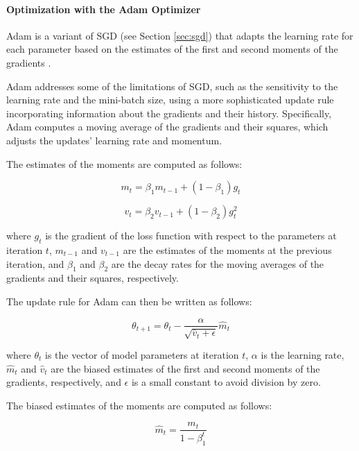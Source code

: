 \paragraph{Optimization with the Adam Optimizer} \label{sec:adam}

Adam is a variant of \ac{SGD} (see Section \ref{sec:sgd}) that adapts the learning rate for each parameter based on the estimates of the first and second moments of the gradients \cite{kingma_adam_2017}.

Adam addresses some of the limitations of \ac{SGD}, such as the sensitivity to the learning rate and the mini-batch size, using a more sophisticated update rule incorporating information about the gradients and their history. Specifically, Adam computes a moving average of the gradients and their squares, which adjusts the updates' learning rate and momentum.

The estimates of the moments are computed as follows:

\begin{equation}
    m_t = \beta_1 m_{t-1} + (1-\beta_1)g_t
\end{equation}

\begin{equation}
    v_t = \beta_2 v_{t-1} + (1-\beta_2)g_t^2
\end{equation}

where $g_t$ is the gradient of the loss function with respect to the parameters at iteration $t$, $m_{t-1}$ and $v_{t-1}$ are the estimates of the moments at the previous iteration, and $\beta_1$ and $\beta_2$ are the decay rates for the moving averages of the gradients and their squares, respectively.

The update rule for Adam can then be written as follows:

\begin{equation}
    \theta_{t+1} = \theta_{t} - \frac{\alpha}{\sqrt{\hat{v}_t+\epsilon}}\hat{m}_t
\end{equation}

where $\theta_t$ is the vector of model parameters at iteration $t$, $\alpha$ is the learning rate, $\hat{m}_t$ and $\hat{v}_t$ are the biased estimates of the first and second moments of the gradients, respectively, and $\epsilon$ is a small constant to avoid division by zero.

The biased estimates of the moments are computed as follows:

\begin{equation}
    \hat{m}_t = \frac{m_t}{1-\beta_1^t}
\end{equation}


